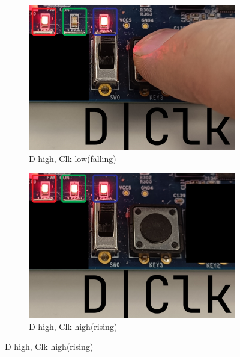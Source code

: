 \documentclass{article}
\begin{document}
\begin{figure}[h]
    \begin{subfigure}[t]{0.45\textwidth}
        \centering
        \includegraphics[width=1\textwidth]{Figures/Part4_3.jpg}
        \caption{D high, Clk low(falling)}
        \label{fig:p4_3}
    \end{subfigure}
    \hfill
    \begin{subfigure}[t]{0.45\textwidth}
        \centering
        \includegraphics[width=1\textwidth]{Figures/Part4_4.jpg}
        \caption{D high, Clk high(rising)}
        \label{fig:p4_4}
    \end{subfigure}
    

\end{figure}
\end{document}
